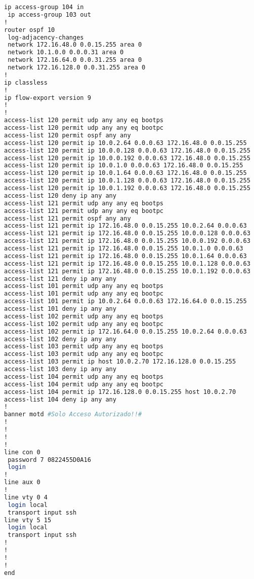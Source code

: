 \begin{lstlisting}[language=Bash, caption={Configuración Completa Switch IoMT Planta 3}]
 ip access-group 104 in
 ip access-group 103 out
!
router ospf 10
 log-adjacency-changes
 network 172.16.48.0 0.0.15.255 area 0
 network 10.1.0.0 0.0.0.31 area 0
 network 172.16.64.0 0.0.31.255 area 0
 network 172.16.128.0 0.0.31.255 area 0
!
ip classless
!
ip flow-export version 9
!
!
access-list 120 permit udp any any eq bootps
access-list 120 permit udp any any eq bootpc
access-list 120 permit ospf any any
access-list 120 permit ip 10.0.2.64 0.0.0.63 172.16.48.0 0.0.15.255
access-list 120 permit ip 10.0.0.128 0.0.0.63 172.16.48.0 0.0.15.255
access-list 120 permit ip 10.0.0.192 0.0.0.63 172.16.48.0 0.0.15.255
access-list 120 permit ip 10.0.1.0 0.0.0.63 172.16.48.0 0.0.15.255
access-list 120 permit ip 10.0.1.64 0.0.0.63 172.16.48.0 0.0.15.255
access-list 120 permit ip 10.0.1.128 0.0.0.63 172.16.48.0 0.0.15.255
access-list 120 permit ip 10.0.1.192 0.0.0.63 172.16.48.0 0.0.15.255
access-list 120 deny ip any any
access-list 121 permit udp any any eq bootps
access-list 121 permit udp any any eq bootpc
access-list 121 permit ospf any any
access-list 121 permit ip 172.16.48.0 0.0.15.255 10.0.2.64 0.0.0.63
access-list 121 permit ip 172.16.48.0 0.0.15.255 10.0.0.128 0.0.0.63
access-list 121 permit ip 172.16.48.0 0.0.15.255 10.0.0.192 0.0.0.63
access-list 121 permit ip 172.16.48.0 0.0.15.255 10.0.1.0 0.0.0.63
access-list 121 permit ip 172.16.48.0 0.0.15.255 10.0.1.64 0.0.0.63
access-list 121 permit ip 172.16.48.0 0.0.15.255 10.0.1.128 0.0.0.63
access-list 121 permit ip 172.16.48.0 0.0.15.255 10.0.1.192 0.0.0.63
access-list 121 deny ip any any
access-list 101 permit udp any any eq bootps
access-list 101 permit udp any any eq bootpc
access-list 101 permit ip 10.0.2.64 0.0.0.63 172.16.64.0 0.0.15.255
access-list 101 deny ip any any
access-list 102 permit udp any any eq bootps
access-list 102 permit udp any any eq bootpc
access-list 102 permit ip 172.16.64.0 0.0.15.255 10.0.2.64 0.0.0.63
access-list 102 deny ip any any
access-list 103 permit udp any any eq bootps
access-list 103 permit udp any any eq bootpc
access-list 103 permit ip host 10.0.2.70 172.16.128.0 0.0.15.255
access-list 103 deny ip any any
access-list 104 permit udp any any eq bootps
access-list 104 permit udp any any eq bootpc
access-list 104 permit ip 172.16.128.0 0.0.15.255 host 10.0.2.70
access-list 104 deny ip any any
!
banner motd #Solo Acceso Autorizado!!#
!
!
!
!
line con 0
 password 7 0822455D0A16
 login
!
line aux 0
!
line vty 0 4
 login local
 transport input ssh
line vty 5 15
 login local
 transport input ssh
!
!
!
!
end


\end{lstlisting}
